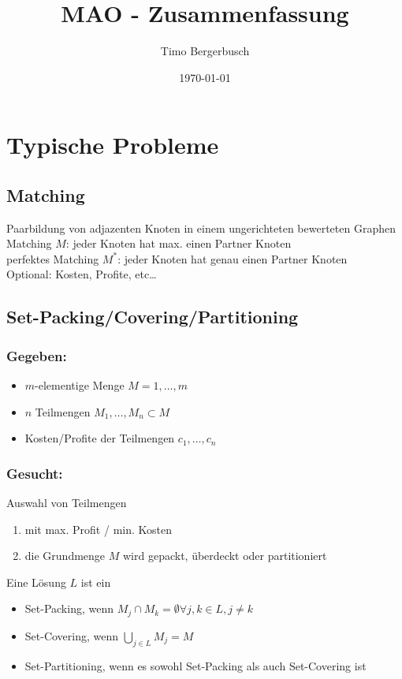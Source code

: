 \documentclass[12pt]{article}
\begin{document}
	
	\title{MAO - Zusammenfassung}
	\author{Timo Bergerbusch}
	\date{\specialdate\today}
	\maketitle
	
	\tableofcontents
	\newpage
	
	\section{Typische Probleme} \label{Standard Probleme}
		\subsection{Matching}
			Paarbildung von adjazenten Knoten in einem ungerichteten bewerteten Graphen\\
			Matching $M$: jeder Knoten hat max. einen Partner Knoten\\
			perfektes Matching $M^*$: jeder Knoten hat genau einen Partner Knoten\\
			Optional: Kosten, Profite, etc\dots
		\subsection{Set-Packing/Covering/Partitioning}
			\subsubsection*{Gegeben: }
			\begin{itemize}
				\item $m$-elementige Menge $M={1, \dots, m}$
				\item $n$ Teilmengen $M_1,\dots,M_n \subset M$
				\item Kosten/Profite der Teilmengen $c_1,\dots,c_n$
			\end{itemize}
			\subsubsection*{Gesucht:} Auswahl von Teilmengen
			\begin{enumerate}
				\item mit max. Profit / min. Kosten
				\item die Grundmenge $M$ wird gepackt, überdeckt oder partitioniert
			\end{enumerate}			
			Eine Lösung $L$ ist ein
			\begin{itemize}
				\item Set-Packing, wenn $M_j \cap M_k = \emptyset \forall j,k \in L, j \neq k$
				\item Set-Covering, wenn $\bigcup_{j\in L} M_j = M$
				\item Set-Partitioning, wenn es sowohl Set-Packing als auch Set-Covering ist
			\end{itemize}
\end{document}
